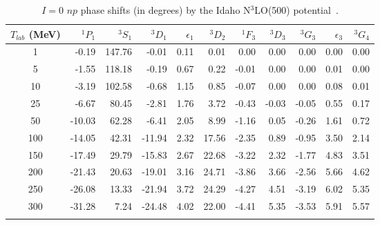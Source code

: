 \documentclass[sort&compress,preprint,3p]{elsarticle}
\begin{document}
\begin{table}
\caption{$I=0$ $np$ phase shifts (in degrees) by the Idaho N$^3$LO(500) potential~\cite{EM03}.
\label{tab_np0}}
\smallskip
\begin{tabular*}{\textwidth}{@{\extracolsep{\fill}}crrrrrrrrrr}
\hline 
\hline 
\noalign{\smallskip}
 $T_{lab}$ (MeV)
 & $^1P_1$
 & $^3S_1$
 & $^3D_1$
 & $\epsilon_1$
 & $^3D_2$
 & $^1F_3$
 & $^3D_3$
 & $^3G_3$
 & $\epsilon_3$
 & $^3G_4$
\\
 \hline 
    1 &  -0.19 & 147.76 &  -0.01 &   0.11 &   0.01 &   0.00 &   0.00 &   0.00 &   0.00 &   0.00 \\
    5 &  -1.55 & 118.18 &  -0.19 &   0.67 &   0.22 &  -0.01 &   0.00 &   0.00 &   0.01 &   0.00 \\
   10 &  -3.19 & 102.58 &  -0.68 &   1.15 &   0.85 &  -0.07 &   0.00 &   0.00 &   0.08 &   0.01 \\
   25 &  -6.67 &  80.45 &  -2.81 &   1.76 &   3.72 &  -0.43 &  -0.03 &  -0.05 &   0.55 &   0.17 \\
   50 & -10.03 &  62.28 &  -6.41 &   2.05 &   8.99 &  -1.16 &   0.05 &  -0.26 &   1.61 &   0.72 \\
  100 & -14.05 &  42.31 & -11.94 &   2.32 &  17.56 &  -2.35 &   0.89 &  -0.95 &   3.50 &   2.14 \\
  150 & -17.49 &  29.79 & -15.83 &   2.67 &  22.68 &  -3.22 &   2.32 &  -1.77 &   4.83 &   3.51 \\
  200 & -21.43 &  20.63 & -19.01 &   3.16 &  24.71 &  -3.86 &   3.66 &  -2.56 &   5.66 &   4.62 \\
  250 & -26.08 &  13.33 & -21.94 &   3.72 &  24.29 &  -4.27 &   4.51 &  -3.19 &   6.02 &   5.35 \\
  300 & -31.28 &   7.24 & -24.48 &   4.02 &  22.00 &  -4.41 &   5.35 &  -3.53 &   5.91 &   5.57 \\
\hline
\hline
\noalign{\smallskip}
\end{tabular*}
\end{table}

\pagebreak
\end{document}
